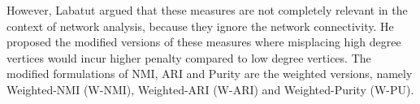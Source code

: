 However, Labatut \cite{Labatut} argued that these measures are not completely relevant in the context of network analysis, because they
ignore the network connectivity.  He proposed the modified versions of these measures where misplacing high degree vertices would incur
higher penalty compared to low degree vertices. The modified formulations of NMI, ARI and Purity are the weighted versions,
namely Weighted-NMI (W-NMI), Weighted-ARI (W-ARI) and Weighted-Purity (W-PU).  

